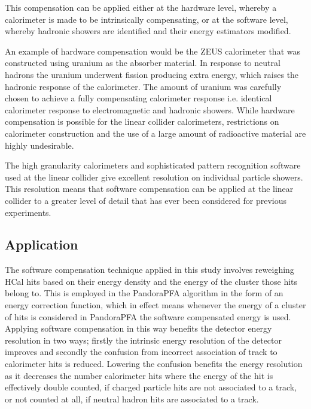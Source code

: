 This compensation can be applied either at the hardware level, whereby a calorimeter is made to be intrinsically compensating, or at the software level, whereby hadronic showers are identified and their energy estimators modified.  

An example of hardware compensation would be the ZEUS calorimeter \cite{Derrick:1991tq} that was constructed using uranium as the absorber material.  In response to neutral hadrons the uranium underwent fission producing extra energy, which raises the hadronic response of the calorimeter.  The amount of uranium was carefully chosen to achieve a fully compensating calorimeter response i.e. identical calorimeter response to electromagnetic and hadronic showers.  While hardware compensation is possible for the linear collider calorimeters, restrictions on calorimeter construction and the use of a large amount of radioactive material are highly undesirable.  

The high granularity calorimeters and sophisticated pattern recognition software used at the linear collider give excellent resolution on individual particle showers.  This resolution means that software compensation can be applied at the linear collider to a greater level of detail that has ever been considered for previous experiments.  


\subsection{Application}
The software compensation technique applied in this study involves reweighing HCal hits based on their energy density and the energy of the cluster those hits belong to.  This is employed in the PandoraPFA algorithm in the form of an energy correction function, which in effect means whenever the energy of a cluster of hits is considered in PandoraPFA the software compensated energy is used.  Applying software compensation in this way benefits the detector energy resolution in two ways; firstly the intrinsic energy resolution of the detector improves and secondly the confusion from incorrect association of track to calorimeter hits is reduced.  Lowering the confusion benefits the energy resolution as it decreases the number calorimeter hits where the energy of the hit is effectively double counted, if charged particle hits are not associated to a track, or not counted at all, if neutral hadron hits are associated to a track.   

